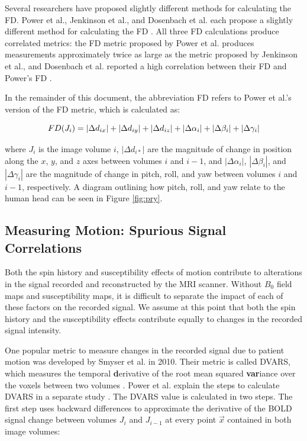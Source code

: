 Several researchers have proposed slightly different methods for calculating the FD. Power et al., Jenkinson et al., and Dosenbach et al. each propose a slightly different method for calculating the FD \cite{Power2012} \cite{Jenkinson2002} \cite{Dosenbach2017}. All three FD calculations produce correlated metrics: the FD metric proposed by Power et al. produces measurements approximately twice as large as the metric proposed by Jenkinson et al., and Dosenbach et al. reported a high correlation between their FD and Power’s FD \cite{Yan2013a} \cite{Dosenbach2017}. 

In the remainder of this document, the abbreviation FD refers to Power et al.'s version of the FD metric, which is calculated as:

\begin{equation}
FD(J_i) = | \Delta d_{ix} | + | \Delta d_{iy} | + | \Delta d_{iz} | \\ + | \Delta \alpha_i | + | \Delta \beta_i | + | \Delta \gamma_i |
\end{equation}

\noindent where $J_i$ is the image volume $i$, $| \Delta d_{i *} |$ are the magnitude of change in position along the $x$, $y$, and $z$ axes between volumes $i$ and $i-1$, and $| \Delta \alpha_i |$, $| \Delta \beta_i |$, and $| \Delta \gamma_i |$ are the magnitude of change in pitch, roll, and yaw between volumes $i$ and $i-1$, respectively. A diagram outlining how pitch, roll, and yaw relate to the human head can be seen in Figure \ref{fig:pry}.

\subsection{Measuring Motion: Spurious Signal Correlations}

Both the spin history and susceptibility effects of motion contribute to alterations in the signal recorded and reconstructed by the MRI scanner. Without $B_0$ field maps and susceptibility maps, it is difficult to separate the impact of each of these factors on the recorded signal. We assume at this point that both the spin history and the susceptibility effects contribute equally to changes in the recorded signal intensity.

One popular metric to measure changes in the recorded signal due to patient motion was developed by Smyser et al. in 2010. Their metric is called DVARS, which measures the temporal \textbf{d}erivative of the root mean squared \textbf{var}iance over the voxels between two volumes \cite{Smyser2010}. Power et al. explain the steps to calculate DVARS in a separate study \cite{Power2012}. The DVARS value is calculated in two steps. The first step uses backward differences to approximate the derivative of the BOLD signal change between volumes $J_i$ and $J_{i-1}$ at every point $\vec{x}$ contained in both image volumes:

